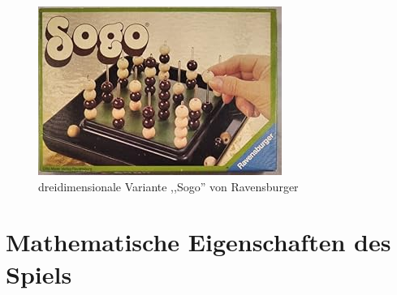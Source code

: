 \begin{figure}[H]
	\centering
	\includegraphics[width=0.8\linewidth]{images/Sogo}
	\caption[Sogo von Ravensburger \autocite{abebooks_image}]{dreidimensionale Variante ,,Sogo'' von Ravensburger}
	\label{fig:Sogo}
\end{figure}
\newpage

\section{Mathematische Eigenschaften des Spiels}
%
%	
%

